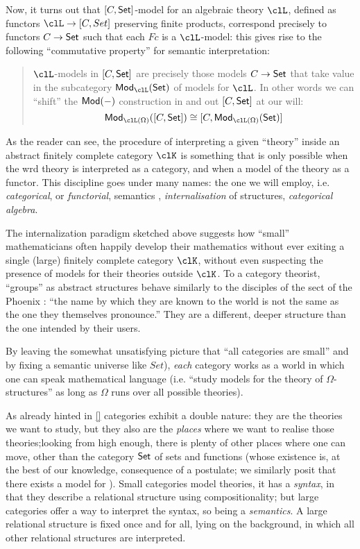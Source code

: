 Now, it turns out that $[C,\mathsf{Set}]$-model for an algebraic theory $\clL$, defined as functors $\clL \to [C,Set]$ preserving finite products, correspond precisely to functors $C\to \mathsf{Set}$ such that each $Fc$ is a $\clL$-model: this gives rise to the following ``commutative property'' for semantic interpretation: 
\begin{quote}
	$\clL$-models in $[C,\mathsf{Set}]$ are precisely those models $C \to \mathsf{Set}$ that take value in the subcategory $\cate{Mod}_{\clL}(\Set)$ of models for $\clL$. In other words we can ``shift'' the $\mathsf{Mod}(-)$ construction in and out $[C,\mathsf{Set}]$ at our will:
\[
	\cate{Mod}_{\clL(\Omega)}([C,\Set]) \cong [C, \cate{Mod}_{\clL(\Omega)}(\Set)]
\]
\end{quote}
As the reader can see, the procedure of interpreting a given ``theory'' inside an abstract finitely complete category $\clK$ is something that is only possible when the wrd theory is interpreted as a category, and when a model of the theory as a functor. This discipline goes under many names: the one we will employ, i.e. \emph{categorical}, or \emph{functorial}, semantics \cite{lawvere1963functorial}, \emph{internalisation} of structures, \emph{categorical algebra}.

The internalization paradigm sketched above suggests how ``small'' mathematicians often happily develop their mathematics without ever exiting a single (large) finitely complete category $\clK$, without even suspecting the presence of models for their theories outside $\clK$. To a category theorist, ``groups'' as abstract structures behave similarly to the disciples of the sect of the Phoenix \cite{fenix}: ``the name by which they are known to the world
is not the same as the one they themselves pronounce.'' They are a different, deeper structure than the one intended by their users.

By leaving the somewhat unsatisfying picture that ``all categories are small'' and by fixing a semantic universe like $Set$), \emph{each} category works as a world in which one can speak mathematical language (i.e. ``study models for the theory of $\Omega$-structures'' as long as $\Omega$ runs over all possible theories).

As already hinted in \autoref{} categories exhibit a double nature: they are the theories we want to study, but they also are the \emph{places} where we want to realise those theories;looking from high enough, there is plenty of other places where one can move, other than the category $\mathsf{Set}$ of sets and functions (whose existence is, at the best of our knowledge, consequence of a postulate; we similarly posit that there exists a model for ). Small categories model theories, it has a \emph{syntax}, in that they describe a relational structure using compositionality; but large categories offer a way to interpret the syntax, so being a \emph{semantics}. A large relational structure is fixed once and for all, lying on the background, in which all other relational structures are interpreted.

